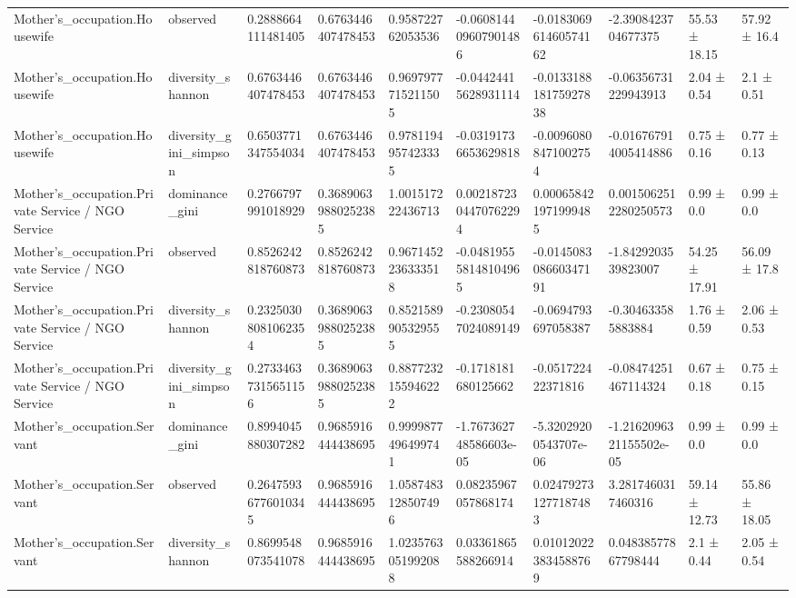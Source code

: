 \begin{longtable}{llllllllll}
Mother’s\_occupation.Housewife & observed & 0.2888664111481405 & 0.6763446407478453 & 0.958722762053536 & -0.060814409607901486 & -0.018306961460574162 & -2.3908423704677375 & 55.53 ± 18.15 & 57.92 ± 16.4 \\
Mother’s\_occupation.Housewife & diversity\_shannon & 0.6763446407478453 & 0.6763446407478453 & 0.9697977715211505 & -0.04424415628931114 & -0.013318818175927838 & -0.06356731229943913 & 2.04 ± 0.54 & 2.1 ± 0.51 \\
Mother’s\_occupation.Housewife & diversity\_gini\_simpson & 0.6503771347554034 & 0.6763446407478453 & 0.9781194957423335 & -0.03191736653629818 & -0.00960808471002754 & -0.016767914005414886 & 0.75 ± 0.16 & 0.77 ± 0.13 \\
Mother’s\_occupation.Private Service / NGO Service & dominance\_gini & 0.2766797991018929 & 0.36890639880252385 & 1.001517222436713 & 0.0021872304470762294 & 0.000658421971999485 & 0.0015062512280250573 & 0.99 ± 0.0 & 0.99 ± 0.0 \\
Mother’s\_occupation.Private Service / NGO Service & observed & 0.8526242818760873 & 0.8526242818760873 & 0.9671452236333518 & -0.048195558148104965 & -0.014508308660347191 & -1.8429203539823007 & 54.25 ± 17.91 & 56.09 ± 17.8 \\
Mother’s\_occupation.Private Service / NGO Service & diversity\_shannon & 0.23250308081062354 & 0.36890639880252385 & 0.8521589905329555 & -0.23080547024089149 & -0.0694793697058387 & -0.304633585883884 & 1.76 ± 0.59 & 2.06 ± 0.53 \\
Mother’s\_occupation.Private Service / NGO Service & diversity\_gini\_simpson & 0.27334637315651156 & 0.36890639880252385 & 0.8877232155946222 & -0.1718181680125662 & -0.051722422371816 & -0.08474251467114324 & 0.67 ± 0.18 & 0.75 ± 0.15 \\
Mother’s\_occupation.Servant & dominance\_gini & 0.8994045880307282 & 0.9685916444438695 & 0.9999877496499741 & -1.767362748586603e-05 & -5.32029200543707e-06 & -1.2162096321155502e-05 & 0.99 ± 0.0 & 0.99 ± 0.0 \\
Mother’s\_occupation.Servant & observed & 0.26475936776010345 & 0.9685916444438695 & 1.0587483128507496 & 0.08235967057868174 & 0.024792731277187483 & 3.2817460317460316 & 59.14 ± 12.73 & 55.86 ± 18.05 \\
Mother’s\_occupation.Servant & diversity\_shannon & 0.8699548073541078 & 0.9685916444438695 & 1.0235763051992088 & 0.03361865588266914 & 0.010120223834588769 & 0.04838577867798444 & 2.1 ± 0.44 & 2.05 ± 0.54 \\

\end{longtable}
